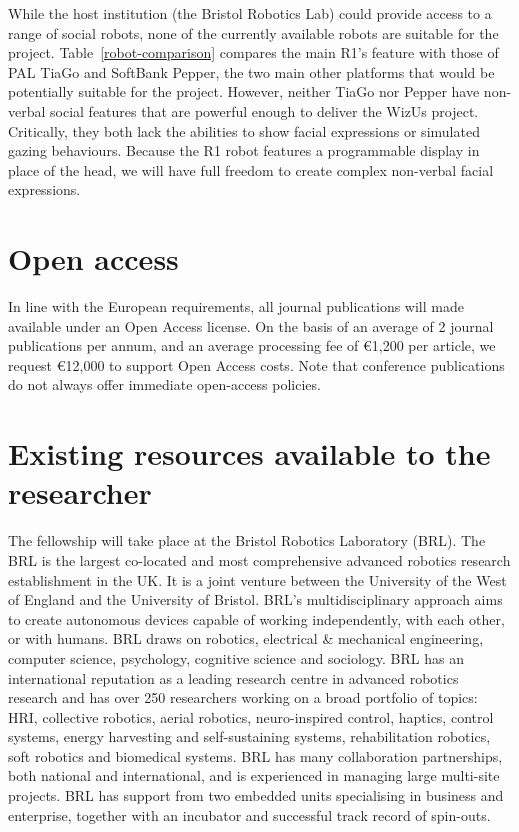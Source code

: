 \documentclass[11pt,a4paper]{report}
\newcommand{\project}{WizUs\xspace}
\begin{document}
While the host institution (the Bristol Robotics Lab) could provide access to a
range of social robots, none of the currently available robots are suitable for
the project.  Table~\ref{robot-comparison} compares the main R1's feature with
those of PAL TiaGo and SoftBank Pepper, the two main other platforms that would
be potentially suitable for the project. However, neither TiaGo nor Pepper have
non-verbal social features that are powerful enough to deliver the \project
project. Critically, they both lack the abilities to show facial expressions or
simulated gazing behaviours. Because the R1 robot features a programmable
display in place of the head, we will have full freedom to create complex
non-verbal facial expressions.

\section{Open access}

In line with the European requirements, all journal publications will made
available under an Open Access license. On the basis of an average of 2 journal
publications per annum, and an average processing fee of €1,200 per article, we
request €12,000 to support Open Access costs. Note that conference publications
do not always offer immediate open-access policies.

\section{Existing resources available to the researcher}

The fellowship will take place at the Bristol Robotics Laboratory (BRL).  The
BRL is the largest co-located and most comprehensive advanced robotics research
establishment in the UK. It is a joint venture between the University of the
West of England and the University of Bristol. BRL's multidisciplinary approach
aims to create autonomous devices capable of working independently, with each
other, or with humans. BRL draws on robotics, electrical \& mechanical
engineering, computer science, psychology, cognitive science and sociology. BRL
has an international reputation as a leading research centre in advanced
robotics research and has over 250 researchers working on a broad portfolio of
topics: HRI, collective robotics, aerial robotics, neuro-inspired control,
haptics, control systems, energy harvesting and self-sustaining systems,
rehabilitation robotics, soft robotics and biomedical systems. BRL has many
collaboration partnerships, both national and international, and is experienced
in managing large multi-site projects. BRL has support from two embedded units
specialising in business and enterprise, together with an incubator and
successful track record of spin-outs.
\end{document}
